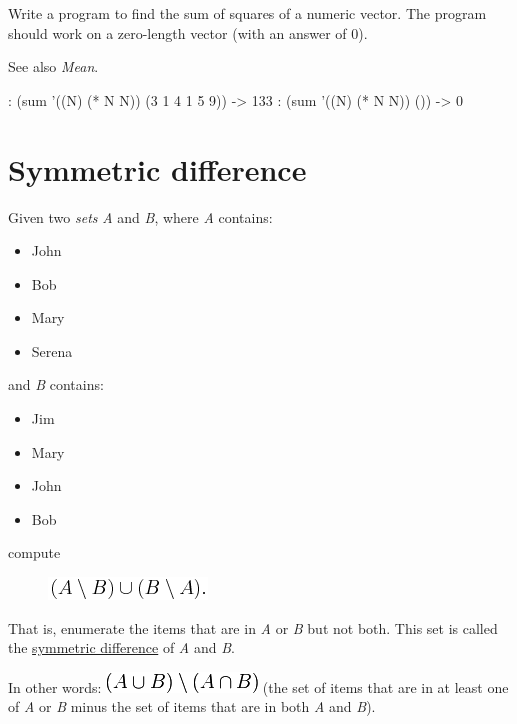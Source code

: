 \begin{itemize}
Write a program to find the sum of squares of a numeric vector. The
program should work on a zero-length vector (with an answer of 0).

See also \emph{Mean}.


\begin{wideverbatim}

: (sum '((N) (* N N)) (3 1 4 1 5 9))
-> 133
: (sum '((N) (* N N)) ())
-> 0

\end{wideverbatim}

\pagebreak{}
\section*{Symmetric difference}


Given two \emph{sets} \emph{A} and \emph{B}, where \emph{A}
contains:

\begin{itemize}
\item
  John
\item
  Bob
\item
  Mary
\item
  Serena
\end{itemize}

and \emph{B} contains:

\begin{itemize}
\item
  Jim
\item
  Mary
\item
  John
\item
  Bob
\end{itemize}

compute

\begin{figure}[H]
\centering
\includegraphics[scale=.6]{graphics/cd81bcd600dda401fc4cfbc6646bbbc9.png}
\end{figure}

That is, enumerate the items that are in \emph{A} or \emph{B} but not
both. This set is called the
\href{http://en.wikipedia.org/wiki/Symmetric\_difference}{symmetric
difference} of \emph{A} and \emph{B}.

In other words:
\includegraphics[scale=.6]{graphics/3fdf48da32bf746ea787b61406ca05e7.png}
(the set of items that are in at least one of \emph{A} or \emph{B} minus
the set of items that are in both \emph{A} and \emph{B}).


\end{itemize}

